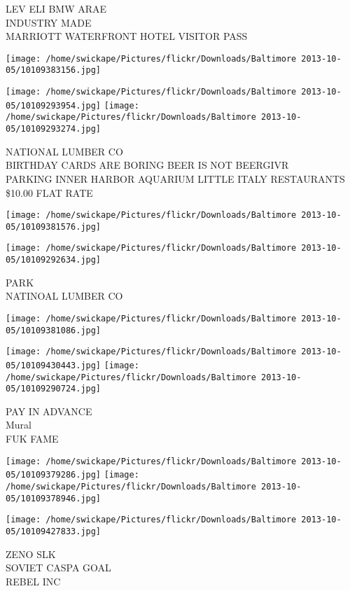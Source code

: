 \documentclass[10pt,letterpaper]{article}
\begin{document}
LEV ELI BMW ARAE\\
INDUSTRY MADE\\
MARRIOTT WATERFRONT HOTEL VISITOR PASS
\pagebreak

\texttt{[image: /home/swickape/Pictures/flickr/Downloads/Baltimore 2013-10-05/10109383156.jpg]}

\vspace{0.25in}
\texttt{[image: /home/swickape/Pictures/flickr/Downloads/Baltimore 2013-10-05/10109293954.jpg]}
\texttt{[image: /home/swickape/Pictures/flickr/Downloads/Baltimore 2013-10-05/10109293274.jpg]}

NATIONAL LUMBER CO\\
BIRTHDAY CARDS ARE BORING BEER IS NOT BEERGIVR\\
PARKING INNER HARBOR AQUARIUM LITTLE ITALY RESTAURANTS \$10.00 FLAT RATE
\pagebreak

\texttt{[image: /home/swickape/Pictures/flickr/Downloads/Baltimore 2013-10-05/10109381576.jpg]}

\vspace{0.25in}
\texttt{[image: /home/swickape/Pictures/flickr/Downloads/Baltimore 2013-10-05/10109292634.jpg]}

PARK\\
NATINOAL LUMBER CO
\pagebreak

\texttt{[image: /home/swickape/Pictures/flickr/Downloads/Baltimore 2013-10-05/10109381086.jpg]}

\vspace{0.25in}
\texttt{[image: /home/swickape/Pictures/flickr/Downloads/Baltimore 2013-10-05/10109430443.jpg]}
\texttt{[image: /home/swickape/Pictures/flickr/Downloads/Baltimore 2013-10-05/10109290724.jpg]}

PAY IN ADVANCE\\
Mural\\
FUK FAME
\pagebreak

\texttt{[image: /home/swickape/Pictures/flickr/Downloads/Baltimore 2013-10-05/10109379286.jpg]}
\texttt{[image: /home/swickape/Pictures/flickr/Downloads/Baltimore 2013-10-05/10109378946.jpg]}

\vspace{0.25in}
\texttt{[image: /home/swickape/Pictures/flickr/Downloads/Baltimore 2013-10-05/10109427833.jpg]}

ZENO SLK\\
SOVIET CASPA GOAL\\
REBEL INC
\pagebreak
\end{document}
